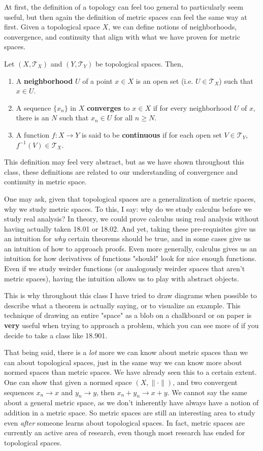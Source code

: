 At first, the definition of a topology can feel too general to particularly seem useful, but then again the definition of metric spaces can feel the same way at first. Given a topological space $X$, we can define notions of neighborhoods, convergence, and continuity that align with what we have proven for metric spaces.
\begin{definition}
Let $(X,\mathcal T_X)$ and $(Y,\mathcal T_Y)$ be topological spaces. Then, 
\begin{enumerate}
    \item A \textbf{neighborhood} $U$ of a point $x\in X$ is an open set (i.e. $U \in \mathcal T_X$) such that $x\in U$.
    \item A sequence $\{x_n\}$ in $X$ \textbf{converges} to $x\in X$ if for every neighborhood $U$ of $x$, there is an $N$ such that $x_n \in U$ for all $n\geq N$.
    \item A function $f:X\to Y$ is said to be \textbf{continuous} if for each open set $V\in \mathcal T_Y$, $f^{-1}(V)\in \mathcal T_X$. 
\end{enumerate}
\end{definition}
This definition may feel very abstract, but as we have shown throughout this class, these definitions are related to our understanding of convergence and continuity in metric space.

One may ask, given that topological spaces are a generalization of metric spaces, why we study metric spaces. To this, I say: why do we study calculus before we study real analysis? In theory, we could prove calculus using real analysis without having actually taken 18.01 or 18.02. And yet, taking these pre-requisites give us an intuition for \textit{why} certain theorems should be true, and in some cases give us an intuition of how to approach proofs. Even more generally, calculus gives us an intuition for how derivatives of functions "should" look for nice enough functions. Even if we study weirder functions (or analogously weirder spaces that aren't metric spaces), having the intuition allows us to play with abstract objects.

This is why throughout this class I have tried to draw diagrams when possible to describe what a theorem is actually saying, or to visualize an example. This technique of drawing an entire "space" as a blob on a chalkboard or on paper is \textbf{very} useful when trying to approach a problem, which you can see more of if you decide to take a class like 18.901.

That being said, there is a \textit{lot} more we can know about metric spaces than we can about topological spaces, just in the same way we can know more about normed spaces than metric spaces. We have already seen this to a certain extent. One can show that given a normed space $(X, \lVert \cdot \rVert)$, and two convergent sequences $x_n\to x$ and $y_n \to y$, then $x_n+y_n \to x+y$. We cannot say the same about a general metric space, as we don't inherently have always have a notion of addition in a metric space. So metric spaces are still an interesting area to study even \textit{after} someone learns about topological spaces.  In fact, metric spaces are currently an active area of research, even though most research has ended for topological spaces.

